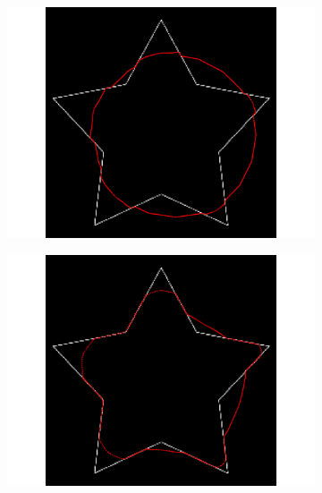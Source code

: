 \begin{appendices}
\begin{figure}[H]
\begin{subfigure}[c]{0.3\linewidth}
\centering
\includegraphics[width=\textwidth]{Chapters/Images/Init/vfccl1}
\caption{}
\end{subfigure}
\begin{subfigure}[c]{0.3\linewidth}
\centering
\includegraphics[width=\textwidth]{Chapters/Images/Init/vfccl2}
\caption{}
\end{subfigure}
\begin{subfigure}[c]{0.3\linewidth}
\centering

\end{subfigure}
\end{figure}
\end{appendices}
